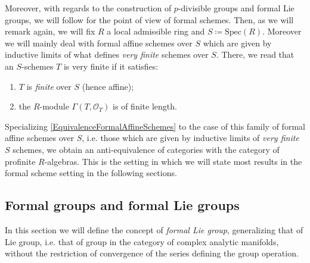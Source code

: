 \begin{rem}[]\label{rem:VeryFiniteSchemes}
	Moreover, with regards to the construction of $p$-divisible groups
	and formal Lie groups, we will follow \cite[\S5]{Shatz} for the point
	of view of formal schemes.
	Then, as we will remark again, we will fix $R$ a 
	local admissible ring and $S \coloneqq \mathrm{Spec}(R)$.
	Moreover we will mainly deal with formal affine schemes over $S$ which
	are given by inductive limits of what \cite{Shatz} defines {\em very finite} schemes over $S$.
	There, we read that an $S$-schemes $T$ is very finite if it satisfies:
	\begin{enumerate}
		\item $T$ is {\em finite} over $S$ (hence affine);
		\item the $R$-module $\Gamma \left( T , \mathcal{O}_{ T } \right)$
			is of finite length.
	\end{enumerate}
	Specializing \cref{EquivalenceFormalAffineSchemes} to the case of
	this family of formal affine schemes over $S$, i.e. those
	which are given by inductive limits of {\em very finite} $S$ schemes,
	we obtain an anti-equivalence of categories with the category of
	profinite $R$-algebras.
	This is the setting in which we will state most results in the 
	formal scheme setting in the following sections.
\end{rem}





\subsection{Formal groups and formal Lie groups}
In this section we will define the concept of {\em formal Lie group},
generalizing that of Lie group, i.e. that of group in the category of
complex analytic manifolds, without the restriction of convergence
of the series defining the group operation.


